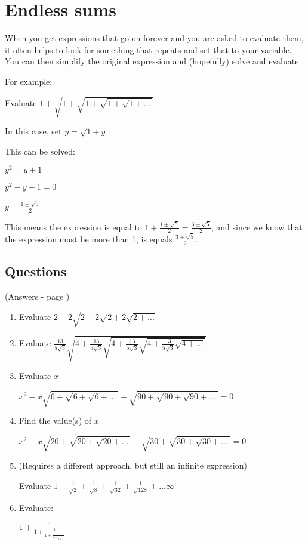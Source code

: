 \documentclass[../main.tex]{subfiles}
\begin{document}
\section{Endless sums}
When you get expressions that go on forever and you are asked to evaluate them, it often helps to look for something that repeats and set that to your variable. You can then simplify the original expression and (hopefully) solve and evaluate.

For example:

Evaluate $1+\sqrt{1+\sqrt{1+\sqrt{1+\sqrt{1+...}}}}$

In this case, set $y=\sqrt{1+y}$

This can be solved:

$y^2=y+1$

$y^2-y-1=0$

$y=\frac{1\pm \sqrt{5}}{2}$

This means the expression is equal to $1+\frac{1\pm \sqrt{5}}{2}=\frac{3\pm \sqrt{5}}{2}$, and since we know that the expression must be more than 1, is equals $\frac{3+\sqrt{5}}{2}$.

\pagebreak

\subsection*{Questions}
(Answers - page {\pageref*{Endless sums answers}})
\label{Endless sums}

\begin{enumerate}[itemsep=2cm]
    \item Evaluate $2+2\sqrt{2+2\sqrt{2+2\sqrt{2+...}}}$
    
    \item Evaluate $\frac{13}{5\sqrt{3}}\sqrt{4+\frac{13}{5\sqrt{3}}\sqrt{4+\frac{13}{5\sqrt{3}}\sqrt{4+\frac{13}{5\sqrt{3}}\sqrt{4+...}}}}$
    
    \item
    Evaluate $x$
    
    $x^2-x\sqrt{6+\sqrt{6+\sqrt{6+...}}}-\sqrt{90+\sqrt{90+\sqrt{90+...}}}=0$

    \item 
    Find the value(s) of $x$
    
    $x^2-x\sqrt{20+\sqrt{20+\sqrt{20+...}}}-\sqrt{30+\sqrt{30+\sqrt{30+...}}}=0$


    \item 
    (Requires a different approach, but still an infinite expression)

    Evaluate $1+\frac{1}{\sqrt{2}}+\frac{1}{\sqrt{8}}+\frac{1}{\sqrt{32}}+\frac{1}{\sqrt{128}}+...\infty$

    \item 
    Evaluate:

    $1+\frac{1}{1+\frac{1}{1+\frac{1}{1+\frac{1}{1+...}}}}$
\end{enumerate}
\end{document}
